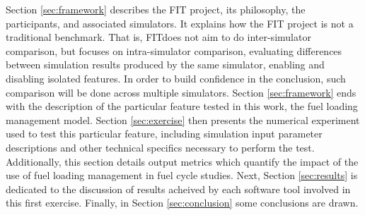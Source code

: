 Section \ref{sec:framework} describes the \gls{FIT} project, its philosophy, the
participants, and associated simulators. It explains how the \gls{FIT} project 
is not a traditional benchmark. That is, \gls{FIT}does not aim to do 
inter-simulator comparison, but focuses on intra-simulator comparison, 
evaluating differences between simulation results produced by the same 
simulator, enabling and disabling isolated features. In order to build 
confidence in the conclusion, such comparison will be done across multiple 
simulators. Section \ref{sec:framework} ends with the description of the 
particular feature tested in this work, the fuel loading management model. 
Section \ref{sec:exercise} then presents the numerical experiment used to test 
this particular feature, including simulation input parameter descriptions and 
other technical specifics necessary to perform the test. Additionally, this 
section details output metrics which quantify the impact of the use of fuel 
loading management in fuel cycle studies. Next, Section \ref{sec:results} is 
dedicated to the discussion of results acheived by each software tool involved 
in this first exercise. Finally, in Section \ref{sec:conclusion} some 
conclusions are drawn.
